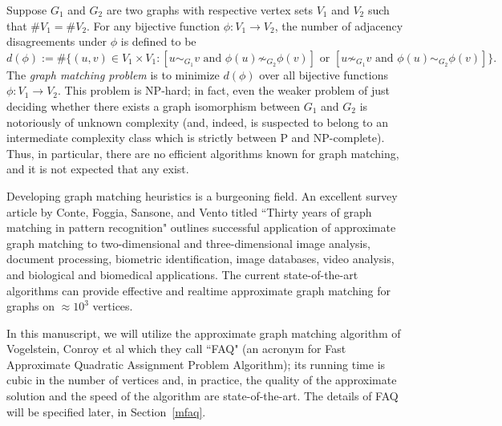 \documentclass[12pt]{article}
\begin{document}
Suppose $G_1$ and $G_2$ are two graphs with respective vertex
sets $V_1$ and $V_2$ such that $\# V_1= \# V_2$. For any bijective function
$\phi : V_1 \rightarrow V_2$, the number of adjacency disagreements under $\phi$ is
defined to be
$ d(\phi):= \# \{ (u,v) \in V_1 \times V_1 :
[u \sim_{G_1} v  \mbox{ and } \phi(u) \not \sim_{G_2} \phi(v)] \mbox{ or }
[u \not \sim_{G_1} v  \mbox{ and } \phi(u) \sim_{G_2} \phi(v)]\}.$
The {\it graph matching problem} is to minimize $d(\phi)$ over all
bijective functions $\phi : V_1 \rightarrow V_2$.
This problem is NP-hard; in fact, even
the weaker problem of just deciding whether there exists a graph
isomorphism between $G_1$ and $G_2$ is notoriously of unknown complexity
(and, indeed, is suspected to belong to an intermediate complexity class
which is strictly between P and NP-complete). Thus, in particular, there are no
efficient algorithms known for graph matching, and it is not expected that
any exist.

Developing graph matching heuristics is a burgeoning field.
An excellent survey article by Conte, Foggia, Sansone, and Vento titled
``Thirty years of graph matching in pattern recognition"\cite{Thirty}
outlines successful application of approximate graph matching
to two-dimensional  and three-dimensional image analysis,
document processing, biometric identification, image databases,
video analysis, and biological and biomedical applications.
The current state-of-the-art algorithms can provide effective and realtime
approximate graph matching for graphs on $\approx 10^3$ vertices.\cite{VogCon}

In this manuscript, we will utilize the approximate graph matching
algorithm of Vogelstein, Conroy et al \cite{VogCon} which they
call ``FAQ" (an acronym for Fast Approximate Quadratic
Assignment Problem Algorithm); its running time is cubic in the number
of vertices and, in practice, the quality of the approximate solution and the
speed of the algorithm are state-of-the-art. The details of FAQ will
be specified later, in Section~\ref{mfaq}.
\end{document}
